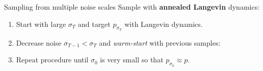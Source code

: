 \begin{frame}{Sampling from multiple noise scales}
    Sample with \textbf{annealed Langevin} dynamics:
    \begin{enumerate}
        \item Start with large $\sigma_T$ and target $p_{\sigma_T}$ with Langevin dynamics.
        \item Decrease noise $\sigma_{T-1} < \sigma_T$ and \textit{warm-start} with previous samples:
        \item Repeat procedure until $\sigma_0$ is very small so that $p_{\sigma_0} \approx p$.
    \end{enumerate}
    
    \begin{center}
    \end{center}
    
\end{frame}


